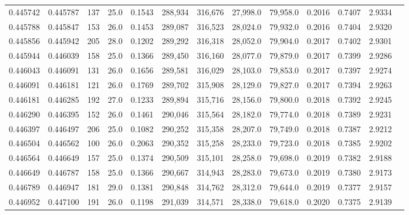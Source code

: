 \begin{tabular}{rrrrrrrrrrrrr}
0.445742 & 0.445787 &   137 & 25.0 &                                     0.1543 & 288,934 & 316,676 &  27,998.0 &  79,958.0 & 0.2016 & 0.7407 & 2.9334 \\
0.445788 & 0.445847 &   153 & 26.0 &                                     0.1453 & 289,087 & 316,523 &  28,024.0 &  79,932.0 & 0.2016 & 0.7404 & 2.9320 \\
0.445856 & 0.445942 &   205 & 28.0 &                                     0.1202 & 289,292 & 316,318 &  28,052.0 &  79,904.0 & 0.2017 & 0.7402 & 2.9301 \\
0.445944 & 0.446039 &   158 & 25.0 &                                     0.1366 & 289,450 & 316,160 &  28,077.0 &  79,879.0 & 0.2017 & 0.7399 & 2.9286 \\
0.446043 & 0.446091 &   131 & 26.0 &                                     0.1656 & 289,581 & 316,029 &  28,103.0 &  79,853.0 & 0.2017 & 0.7397 & 2.9274 \\
0.446091 & 0.446181 &   121 & 26.0 &                                     0.1769 & 289,702 & 315,908 &  28,129.0 &  79,827.0 & 0.2017 & 0.7394 & 2.9263 \\
0.446181 & 0.446285 &   192 & 27.0 &                                     0.1233 & 289,894 & 315,716 &  28,156.0 &  79,800.0 & 0.2018 & 0.7392 & 2.9245 \\
0.446290 & 0.446395 &   152 & 26.0 &                                     0.1461 & 290,046 & 315,564 &  28,182.0 &  79,774.0 & 0.2018 & 0.7389 & 2.9231 \\
0.446397 & 0.446497 &   206 & 25.0 &                                     0.1082 & 290,252 & 315,358 &  28,207.0 &  79,749.0 & 0.2018 & 0.7387 & 2.9212 \\
0.446504 & 0.446562 &   100 & 26.0 &                                     0.2063 & 290,352 & 315,258 &  28,233.0 &  79,723.0 & 0.2018 & 0.7385 & 2.9202 \\
0.446564 & 0.446649 &   157 & 25.0 &                                     0.1374 & 290,509 & 315,101 &  28,258.0 &  79,698.0 & 0.2019 & 0.7382 & 2.9188 \\
0.446649 & 0.446787 &   158 & 25.0 &                                     0.1366 & 290,667 & 314,943 &  28,283.0 &  79,673.0 & 0.2019 & 0.7380 & 2.9173 \\
0.446789 & 0.446947 &   181 & 29.0 &                                     0.1381 & 290,848 & 314,762 &  28,312.0 &  79,644.0 & 0.2019 & 0.7377 & 2.9157 \\
0.446952 & 0.447100 &   191 & 26.0 &                                     0.1198 & 291,039 & 314,571 &  28,338.0 &  79,618.0 & 0.2020 & 0.7375 & 2.9139 \\

\end{tabular}

